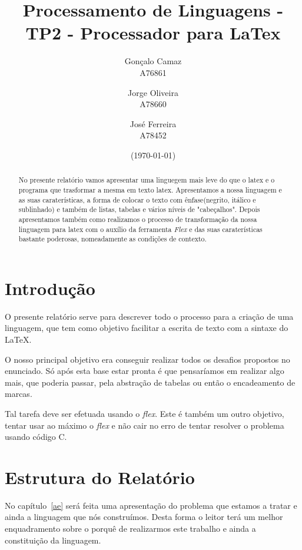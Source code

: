 \documentclass{article}
\title{Processamento de Linguagens - TP2 - Processador para LaTex}
\author{Gonçalo Camaz \\ A76861
        \and
        Jorge Oliveira\\ A78660
        \and José Ferreira\\ A78452 }
\date{ (\today)}
\begin{document}
\maketitle

\pagebreak

\begin{abstract}
No presente relatório vamos apresentar uma linguegem mais leve do que o latex e o programa que trasformar a mesma em texto latex.
Apresentamos a nossa linguagem e as suas caraterísticas, a forma de colocar o texto com ênfase(negrito, itálico e sublinhado) e também de listas, tabelas e vários níveis de "cabeçalhos".
Depois apresentamos também como realizamos o processo de transformação da nossa linguagem para latex com o auxílio da ferramenta \textit{Flex} e das suas caraterísticas bastante poderosas, nomeadamente as condições de contexto.
\end{abstract}

\tableofcontents

\listoffigures

\pagebreak

\section{Introdução}

O presente relatório serve para descrever todo o processo para a criação de uma linguagem, que tem como objetivo facilitar a escrita de texto com a sintaxe do \LaTeX.

O nosso principal objetivo era conseguir realizar todos os desafios propostos no enunciado. Só após esta base estar pronta é que pensaríamos em realizar algo mais, que poderia passar, pela abstração de tabelas ou então o encadeamento de marcas.

Tal tarefa deve ser efetuada usando o \textit{flex}. Este é também um outro objetivo, tentar usar ao máximo o \textit{flex} e não cair no erro de tentar resolver o problema usando código C.



\section{Estrutura do Relatório} 
No capítulo~\ref{ae} será feita uma apresentação do problema que estamos a tratar e ainda a linguagem que nós construímos. Desta forma o leitor terá um melhor enquadramento sobre o porquê de realizarmos este trabalho e ainda a constituição da linguagem. \par
\end{document}
